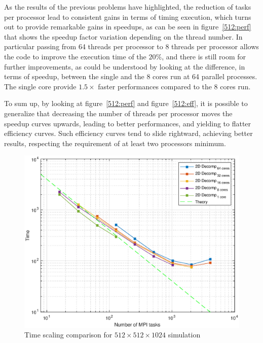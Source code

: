 \par
As the results of the previous problems have highlighted, the reduction of tasks per processor lead to consistent gains in terms of timing execution, which turns out to provide remarkable gains in speedups, as can be seen in figure~\ref{512:perf} that shows the speedup factor variation depending on the thread number. In particular passing from 64 threads per processor to 8 threads per processor allows the code to improve the execution time of the $20\%$, and there is still room for further improvements, as could be understood by looking at the difference, in terms of speedup, between the single and the 8 cores run at 64 parallel processes. The single core provide $1.5\times$ faster performances compared to the 8 cores run. \\
\par
To sum up, by looking at figure~\ref{512:perf} and figure~\ref{512:eff}, it is possible to generalize that decreasing the number of threads per processor moves the speedup curves upwards, leading to better performances, and yielding to flatter efficiency curves. Such efficiency curves tend to slide rightward, achieving better results, respecting the requirement of at least two processors minimum. 


\begin{figure}
\begin{center}
\includegraphics[scale=0.55]{grafici/5124}
\caption{Time scaling comparison for $512\times 512\times 1024$ simulation}
\label{512:times}
\end{center}
\end{figure}

